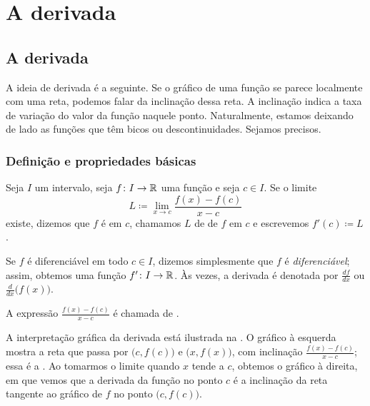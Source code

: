 \chapter{A derivada} \label{der:chapter}


\section{A derivada}
\label{sec:der}



A ideia de derivada é a seguinte.
Se o gráfico de uma função se parece localmente com uma reta,
podemos falar da inclinação dessa reta.
A inclinação indica a taxa de variação do valor da função naquele ponto.
Naturalmente, estamos deixando de lado as funções que têm bicos ou
descontinuidades.
Sejamos precisos.

\subsection{Definição e propriedades básicas}

\begin{defn}
Seja $I$ um intervalo, seja
$f \colon I \to {\mathbb{R}}$ uma função e seja $c \in I$. Se o limite
\begin{equation*}
L \coloneqq \lim_{x \to c} \frac{f(x)-f(c)}{x-c} 
\end{equation*}
existe, dizemos que $f$ é
\emph{} em
$c$, chamamos $L$ de \emph{} de $f$ em $c$
e escrevemos $f'(c) \coloneqq L$.

\medskip

Se $f$ é diferenciável em todo $c \in I$, dizemos simplesmente que
$f$ é \emph{diferenciável}; assim, obtemos uma função
$f' \colon I \to {\mathbb{R}}$.
Às vezes, a derivada é denotada por $\frac{df}{dx}$ ou
$\frac{d}{dx}\bigl( f(x) \bigr)$.

\medskip

A expressão $\frac{f(x)-f(c)}{x-c}$ é chamada de
\emph{}.
\end{defn}

A interpretação gráfica da derivada está ilustrada na
. O gráfico à esquerda mostra a reta que passa por
$\bigl(c,f(c)\bigr)$ e $\bigl(x,f(x)\bigr)$, com inclinação
$\frac{f(x)-f(c)}{x-c}$; essa é a
\emph{}. Ao tomarmos o limite quando $x$ tende a $c$,
obtemos o gráfico à direita, em que vemos que a derivada da função
no ponto $c$ é a inclinação da reta tangente ao gráfico de $f$
no ponto $\bigl(c,f(c)\bigr)$.

